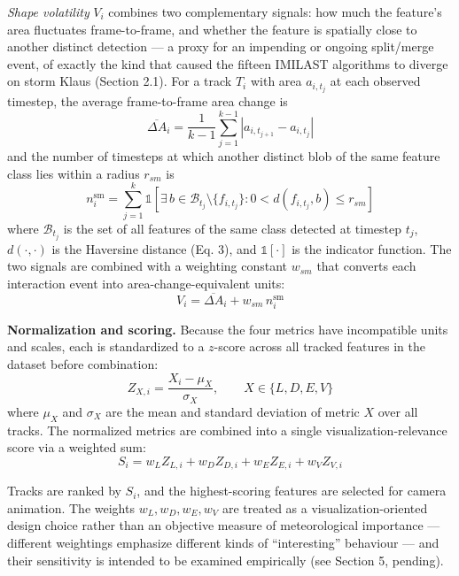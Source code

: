 \documentclass[journal abbreviation, manuscript]{copernicus}
\begin{document}
\textit{Shape volatility} $V_i$ combines two complementary signals: how much the feature's area fluctuates frame-to-frame, and whether the feature is spatially close to another distinct detection --- a proxy for an impending or ongoing split/merge event, of exactly the kind that caused the fifteen IMILAST algorithms to diverge on storm Klaus (Section 2.1). For a track $T_i$ with area $a_{i,t_j}$ at each observed timestep, the average frame-to-frame area change is
\begin{equation}
\overline{\Delta A}_i =
\frac{1}{k-1}
\sum_{j=1}^{k-1}
\left|
a_{i,t_{j+1}} - a_{i,t_j}
\right|
\tag{7a}
\end{equation}
and the number of timesteps at which another distinct blob of the same feature class lies within a radius $r_{sm}$ is
\begin{equation}
n_i^{\mathrm{sm}} =
\sum_{j=1}^{k}
\mathbb{1}\!\left[
\exists\, b \in
\mathcal{B}_{t_j}\setminus\{f_{i,t_j}\} :
0 < d(f_{i,t_j},b) \leq r_{sm}
\right]
\tag{7b}
\end{equation}
where $\mathcal{B}_{t_j}$ is the set of all features of the same class detected at timestep $t_j$, $d(\cdot,\cdot)$ is the Haversine distance (Eq. 3), and $\mathbb{1}[\cdot]$ is the indicator function. The two signals are combined with a weighting constant $w_{sm}$ that converts each interaction event into area-change-equivalent units:
\begin{equation}
V_i =
\overline{\Delta A}_i + w_{sm}\,n_i^{\mathrm{sm}}
\tag{7}
\end{equation}

\textbf{Normalization and scoring.} Because the four metrics have incompatible units and scales, each is standardized to a $z$-score across all tracked features in the dataset before combination:
\begin{equation}
Z_{X,i} =
\frac{X_i-\mu_X}{\sigma_X},
\qquad
X \in \{L,D,E,V\}
\tag{8}
\end{equation}
where $\mu_X$ and $\sigma_X$ are the mean and standard deviation of metric $X$ over all tracks. The normalized metrics are combined into a single visualization-relevance score via a weighted sum:
\begin{equation}
S_i =
w_L Z_{L,i}
+
w_D Z_{D,i}
+
w_E Z_{E,i}
+
w_V Z_{V,i}
\tag{9}
\end{equation}

Tracks are ranked by $S_i$, and the highest-scoring features are selected for camera animation. The weights $w_L,w_D,w_E,w_V$ are treated as a visualization-oriented design choice rather than an objective measure of meteorological importance --- different weightings emphasize different kinds of ``interesting'' behaviour --- and their sensitivity is intended to be examined empirically (see Section 5, pending).
\end{document}
